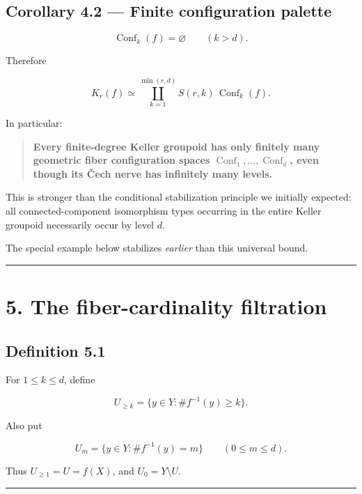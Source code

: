 \subsection{Corollary 4.2 --- Finite configuration
palette}\label{corollary-4.2-finite-configuration-palette}

\[
\operatorname{Conf}_k(f)=\varnothing
\qquad(k>d).
\]

Therefore

\[
\boxed{
K_r(f)\simeq
\coprod_{k=1}^{\min(r,d)}
S(r,k)\,\operatorname{Conf}_k(f).
}
\]

In particular:

\begin{quote}
\textbf{Every finite-degree Keller groupoid has only finitely many
geometric fiber configuration spaces
\(\operatorname{Conf}_1,\dots,\operatorname{Conf}_d\), even though its
Čech nerve has infinitely many levels.}
\end{quote}

This is stronger than the conditional stabilization principle we
initially expected: all connected-component isomorphism types occurring
in the entire Keller groupoid necessarily occur by level \(d\).

The special example below stabilizes \emph{earlier} than this universal
bound.

\begin{center}\rule{0.5\linewidth}{0.5pt}\end{center}

\section{5. The fiber-cardinality
filtration}\label{the-fiber-cardinality-filtration}

\subsection{Definition 5.1}\label{definition-5.1}

For \(1\le k\le d\), define

\[
U_{\ge k}
=
\{y\in Y:\#f^{-1}(y)\ge k\}.
\]

Also put

\[
U_m
=
\{y\in Y:\#f^{-1}(y)=m\}
\qquad(0\le m\le d).
\]

Thus \(U_{\ge1}=U=f(X)\), and \(U_0=Y\setminus U\).

\begin{center}\rule{0.5\linewidth}{0.5pt}\end{center}

